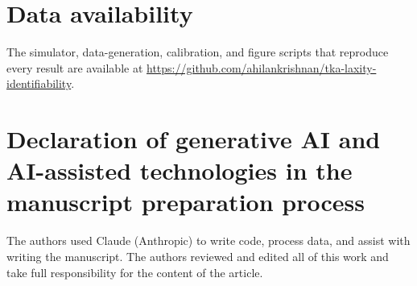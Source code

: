 \documentclass{article}
\begin{document}
\section*{Data availability}
The simulator, data-generation, calibration, and figure scripts that reproduce every result are available at \url{https://github.com/ahilankrishnan/tka-laxity-identifiability}.

\section*{Declaration of generative AI and AI-assisted technologies in the manuscript preparation process}
The authors used Claude (Anthropic) to write code, process data, and assist with writing the manuscript.
The authors reviewed and edited all of this work and take full responsibility for the content of the article.

\newpage
\printbibliography

\appendix
\newpage

\end{document}
